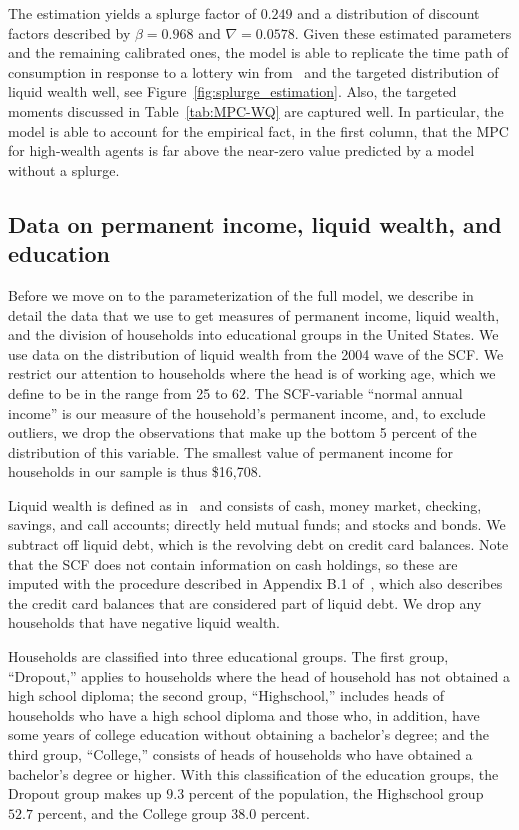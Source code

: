 \documentclass[qe]{econsocart}
\begin{document}
The estimation yields a splurge factor of $0.249$ and a distribution of discount factors described by $\beta = 0.968$ and $\nabla=0.0578$.
Given these estimated parameters and the remaining calibrated ones, the model is able to replicate the time path of consumption in response to a lottery win from~\cite{fagereng-mpc-2021} and the targeted distribution of liquid wealth well, see Figure~\ref{fig:splurge_estimation}.
Also, the targeted moments discussed in Table~\ref{tab:MPC-WQ} are captured well.
In particular, the model is able to account for the empirical fact, in the first column, that the MPC for high-wealth agents is far above the near-zero value predicted by a model without a splurge.

\subsection{Data on permanent income, liquid wealth, and education}\label{data-on-permanent-income-liquid-wealth-and-education}
\label{sec:SCFdata}

Before we move on to the parameterization of the full model, we describe in detail the data that we use to get measures of permanent income, liquid wealth, and the division of households into educational groups in the United States.
We use data on the distribution of liquid wealth from the 2004 wave of the SCF.
We restrict our attention to households where the head is of working age, which we define to be in the range from 25 to 62.
The SCF-variable ``normal annual income'' is our measure of the household's permanent income, and, to exclude outliers, we drop the observations that make up the bottom 5 percent of the distribution of this variable.
The smallest value of permanent income for households in our sample is thus \$16,708.

Liquid wealth is defined as in~\cite{kaplan2014model} and consists of cash, money market, checking, savings, and call accounts; directly held mutual funds; and stocks and bonds.
We subtract off liquid debt, which is the revolving debt on credit card balances.
Note that the SCF does not contain information on cash holdings, so these are imputed with the procedure described in Appendix B.1 of~\cite{kaplan2014model}, which also describes the credit card balances that are considered part of liquid debt.
We drop any households that have negative liquid wealth.

Households are classified into three educational groups.
The first group, ``Dropout,'' applies to households where the head of household has not obtained a high school diploma; the second group, ``Highschool,'' includes heads of households who have a high school diploma and those who, in addition, have some years of college education without obtaining a bachelor's degree; and the third group, ``College,'' consists of heads of households who have obtained a bachelor's degree or higher.
With this classification of the education groups, the Dropout group makes up $9.3$ percent of the population, the Highschool group $52.7$ percent, and the College group $38.0$ percent.
\end{document}
